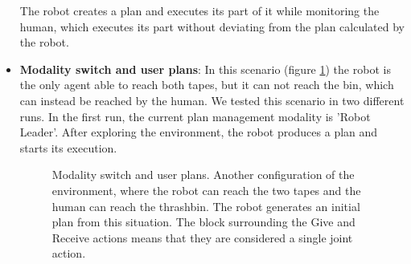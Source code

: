 \begin{itemize}
The robot creates a plan and executes its part of it while monitoring the human,
which executes its part without deviating from the plan calculated by
the robot.

\item
\textbf{Modality switch and user plans}:
In this scenario (figure \ref{fig:case_study-helper_scenario2}) the robot is the only agent able to reach both tapes, but it can not reach
the bin, which can instead be reached by the human. We tested
this scenario in two different runs. In the first run, the current plan management modality is 'Robot Leader'.
After exploring the environment, the robot produces a plan and starts its execution.

\begin{figure}
  \centering
  \caption{Modality switch and user plans. Another configuration of
    the environment, where the robot can reach the two tapes and the
    human can reach the thrashbin. The robot generates an initial plan
  from this situation. The block surrounding the Give and Receive
  actions means that they are considered a single joint action.}
  \centering
  \label{fig:case_study-helper_scenario2}
\end{figure}


\end{itemize}
